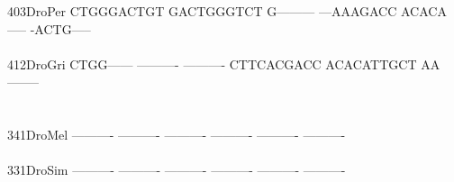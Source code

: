 \documentclass[11pt,twoside,reqno,a4paper]{article}
\begin{document}
{403\hspace*{1\charwidth}DroPer	CTGGGACTGT	GACTGGGTCT	G---------	---AAAGACC	ACACA-----	-ACTG-----	\\
\hspace*{4\charwidth}\hspace*{7\charwidth}\hspace*{1\charwidth}\hspace*{1\charwidth}\hspace*{1\charwidth}\hspace*{1\charwidth}\hspace*{1\charwidth}\hspace*{1\charwidth}\\
412\hspace*{1\charwidth}DroGri	CTGG------	----------	----------	CTTCACGACC	ACACATTGCT	AA--------	\\
\hspace*{4\charwidth}\hspace*{7\charwidth}\hspace*{1\charwidth}\hspace*{1\charwidth}\hspace*{1\charwidth}\hspace*{1\charwidth}\hspace*{1\charwidth}\hspace*{1\charwidth}\\
\\
341\hspace*{1\charwidth}DroMel	----------	----------	----------	----------	----------	----------	\\
\hspace*{4\charwidth}\hspace*{7\charwidth}\hspace*{1\charwidth}\hspace*{1\charwidth}\hspace*{1\charwidth}\hspace*{1\charwidth}\hspace*{1\charwidth}\hspace*{1\charwidth}\\
331\hspace*{1\charwidth}DroSim	----------	----------	----------	----------	----------	----------	\\
\hspace*{4\charwidth}\hspace*{7\charwidth}\hspace*{1\charwidth}\hspace*{1\charwidth}\hspace*{1\charwidth}\hspace*{1\charwidth}\hspace*{1\charwidth}\hspace*{1\charwidth}\\
}
\end{document}
